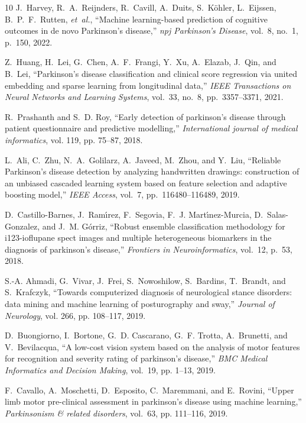 \documentclass{article}
\begin{document}
\begin{thebibliography}{10}
J.~Harvey, R.~A.~Reijnders, R.~Cavill, A.~Duits, S.~K{\"o}hler, L.~Eijssen, B.~P.~F.~Rutten, \emph{et~al.},
``Machine learning-based prediction of cognitive outcomes in de novo Parkinson’s disease,''
\emph{npj Parkinson's Disease}, vol.~8, no.~1, p.~150, 2022.

Z.~Huang, H.~Lei, G.~Chen, A.~F.~Frangi, Y.~Xu, A.~Elazab, J.~Qin, and B.~Lei,
``Parkinson’s disease classification and clinical score regression via united embedding and sparse learning from longitudinal data,''
\emph{IEEE Transactions on Neural Networks and Learning Systems}, vol.~33, no.~8, pp.~3357--3371, 2021.

R.~Prashanth and S.~D. Roy, ``Early detection of parkinson’s disease through
  patient questionnaire and predictive modelling,'' \emph{International journal
  of medical informatics}, vol. 119, pp. 75--87, 2018.

L.~Ali, C.~Zhu, N.~A.~Golilarz, A.~Javeed, M.~Zhou, and Y.~Liu,
``Reliable Parkinson’s disease detection by analyzing handwritten drawings: construction of an unbiased cascaded learning system based on feature selection and adaptive boosting model,''
\emph{IEEE Access}, vol.~7, pp.~116480--116489, 2019.

D.~Castillo-Barnes, J.~Ram{\'\i}rez, F.~Segovia, F.~J. Mart{\'\i}nez-Murcia,
  D.~Salas-Gonzalez, and J.~M. G{\'o}rriz, ``Robust ensemble classification
  methodology for i123-ioflupane spect images and multiple heterogeneous
  biomarkers in the diagnosis of parkinson's disease,'' \emph{Frontiers in
  Neuroinformatics}, vol.~12, p.~53, 2018.

S.-A. Ahmadi, G.~Vivar, J.~Frei, S.~Nowoshilow, S.~Bardins, T.~Brandt, and
  S.~Krafczyk, ``Towards computerized diagnosis of neurological stance
  disorders: data mining and machine learning of posturography and sway,''
  \emph{Journal of Neurology}, vol. 266, pp. 108--117, 2019.

D.~Buongiorno, I.~Bortone, G.~D. Cascarano, G.~F. Trotta, A.~Brunetti, and
  V.~Bevilacqua, ``A low-cost vision system based on the analysis of motor
  features for recognition and severity rating of parkinson’s disease,''
  \emph{BMC Medical Informatics and Decision Making}, vol.~19, pp. 1--13, 2019.

F.~Cavallo, A.~Moschetti, D.~Esposito, C.~Maremmani, and E.~Rovini, ``Upper
  limb motor pre-clinical assessment in parkinson's disease using machine
  learning,'' \emph{Parkinsonism \& related disorders}, vol.~63, pp. 111--116,
  2019.


\end{thebibliography}
\end{document}
